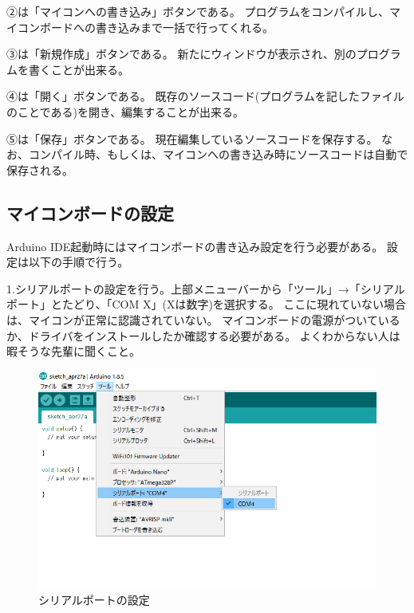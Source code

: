 \documentclass[uplatex]{jsarticle}
\begin{document}
②は「マイコンへの書き込み」ボタンである。
プログラムをコンパイルし、マイコンボードへの書き込みまで一括で行ってくれる。

③は「新規作成」ボタンである。
新たにウィンドウが表示され、別のプログラムを書くことが出来る。

④は「開く」ボタンである。
既存のソースコード(プログラムを記したファイルのことである)を開き、編集することが出来る。

⑤は「保存」ボタンである。
現在編集しているソースコードを保存する。
なお、コンパイル時、もしくは、マイコンへの書き込み時にソースコードは自動で保存される。

\subsection{マイコンボードの設定}
Arduino IDE起動時にはマイコンボードの書き込み設定を行う必要がある。
設定は以下の手順で行う。

1.シリアルポートの設定を行う。上部メニューバーから「ツール」→「シリアルポート」とたどり、「COM X」(Xは数字)を選択する。
ここに現れていない場合は、マイコンが正常に認識されていない。
マイコンボードの電源がついているか、ドライバをインストールしたか確認する必要がある。
よくわからない人は暇そうな先輩に聞くこと。
\begin{figure}[htbp]
    \centering
    \includegraphics[width=13cm]{serial_config.png}
    \caption{シリアルポートの設定}
\end{figure}
\end{document}
